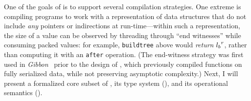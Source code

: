 %

{One of the goals of \ourcalc{} is to support several compilation
  strategies. One extreme is compiling programs to work with a representation of
  data structures that do not include \emph{any} pointers or indirections at
  run-time---within such a representation, the size of a value can be observed
  by threading through ``end witnesses'' while consuming packed values: for
  example, \lstinline[mathescape]{buildtree} above would \emph{return} ${l_b}^{r}$, rather than computing
  it with an \lstinline[mathescape]{after} operation.
  (The end-witness strategy was first used in
  {\em Gibbon}~\cite{ecoop17-gibbon} prior to the design of \ourcalc{},
  which previously compiled functions on fully serialized data,
  while not preserving asymptotic complexity.)
}
%
%
%
%
Next, I will present a formalized core subset of \ourcalc,
its type system (),
and its operational semantics ().

